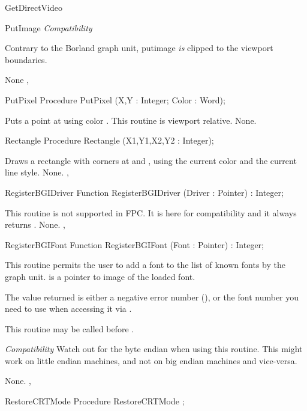 \begin{function}{GetDirectVideo}
\begin{procedure}{PutImage}
\textit{Compatibility}

Contrary to the Borland graph unit, putimage \textit{is} clipped to the
viewport boundaries.

\Errors
None
\SeeAlso
{},
\end{procedure}
\begin{procedure}{PutPixel}
\Declaration
Procedure PutPixel (X,Y : Integer; Color : Word);

\Description
Puts a point at
 using color . This routine is viewport
relative.
\Errors
None.
\SeeAlso
{}
\end{procedure}
\begin{procedure}{Rectangle}
\Declaration
Procedure Rectangle (X1,Y1,X2,Y2 : Integer);

\Description
Draws a rectangle with
corners at  and , using the current color and
the current line style.
\Errors
None.
\SeeAlso
{}, 
\end{procedure}
\begin{function}{RegisterBGIDriver}
\Declaration
Function RegisterBGIDriver (Driver : Pointer) : Integer;

\Description
This routine is not supported in FPC. It is here for compatibility and it
always returns .
\Errors
None.
\SeeAlso
{},
\end{function}
\begin{function}{RegisterBGIFont}
\Declaration
Function RegisterBGIFont (Font : Pointer) : Integer;

\Description
This routine permits the user to add a font to the list of known fonts
by the graph unit.  is a pointer to image of the loaded font.

The value returned is either a negative error number (),
or the font number you need to use when accessing it via .

This routine may be called before .


\textit{Compatibility}
Watch out for the byte endian when using this routine. This might work
on little endian machines, and not on big endian machines and vice-versa.


\Errors
None.
\SeeAlso
{},
\end{function}
\begin{procedure}{RestoreCRTMode}
\Declaration
Procedure RestoreCRTMode ;


\end{procedure}
\end{function}
